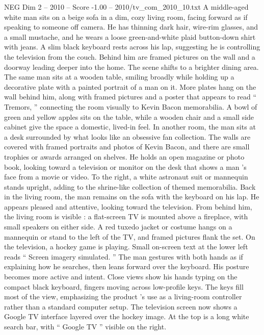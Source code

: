 \begin{textsample}{NEG Dim 2 – 2010 – Score -1.00 – 2010/tv\_com\_2010\_10.txt}  \label{ex:f2_neg_043}
A middle-aged white man sits on a beige sofa in a dim, cozy living room, facing forward as if speaking to someone off camera.
He has thinning dark hair, wire-rim glasses, and a small mustache, and he wears a loose green-and-white plaid button-down shirt with jeans.
A slim black keyboard rests across his lap, suggesting he is controlling the television from the couch.
Behind him are framed pictures on the wall and a doorway leading deeper into the home.
The scene shifts to a brighter dining area.
The same man sits at a wooden table, smiling broadly while holding up a decorative plate with a painted portrait of a man on it.
More plates hang on the wall behind him, along with framed pictures and a poster that appears to read “ Tremors, ” connecting the room visually to Kevin Bacon memorabilia.
A bowl of green and yellow apples sits on the table, while a wooden chair and a small side cabinet give the space a domestic, lived-in feel.
In another room, the man sits at a desk surrounded by what looks like an obsessive fan collection.
The walls are covered with framed portraits and photos of Kevin Bacon, and there are small trophies or awards arranged on shelves.
He holds an open magazine or photo book, looking toward a television or monitor on the desk that shows a man ’s face from a movie or video.
To the right, a white astronaut suit or mannequin stands upright, adding to the shrine-like collection of themed memorabilia.
Back in the living room, the man remains on the sofa with the keyboard on his lap.
He appears pleased and attentive, looking toward the television.
From behind him, the living room is visible : a flat-screen TV is mounted above a fireplace, with small speakers on either side.
A red tuxedo jacket or costume hangs on a mannequin or stand to the left of the TV, and framed pictures flank the set.
On the television, a hockey game is playing.
Small on-screen text at the lower left reads “ Screen imagery simulated. ” The man gestures with both hands as if explaining how he searches, then leans forward over the keyboard.
His posture becomes more active and intent.
Close views show his hands typing on the compact black keyboard, fingers moving across low-profile keys.
The keys fill most of the view, emphasizing the product ’s use as a living-room controller rather than a standard computer setup.
The television screen now shows a Google TV interface layered over the hockey image.
At the top is a long white search bar, with “ Google TV ” visible on the right.

\end{textsample}
